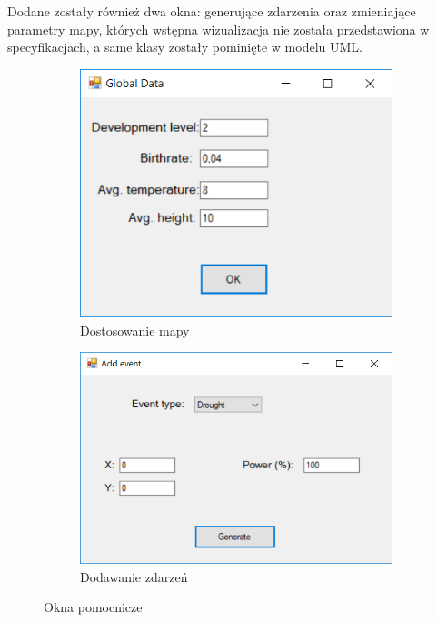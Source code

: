 \documentclass[a4paper,12pt]{article}
\begin{document}
Dodane zostały również dwa okna: generujące zdarzenia oraz zmieniające parametry mapy, których wstępna wizualizacja nie została przedstawiona w specyfikacjach, a same klasy zostały pominięte w modelu UML.

\begin{figure}[H]
    \centering
    \begin{subfigure}[b]{0.49\textwidth}
        \centering
        \includegraphics[width=1\textwidth]{adjust}
        \caption{Dostosowanie mapy}
    \end{subfigure}
    \begin{subfigure}[b]{0.49\textwidth}
        \centering
        \includegraphics[width=1\textwidth]{event}
        \caption{Dodawanie zdarzeń}
    \end{subfigure}

    \caption{Okna pomocnicze}
    \label{fig:GUI2}
\end{figure}
\end{document}
